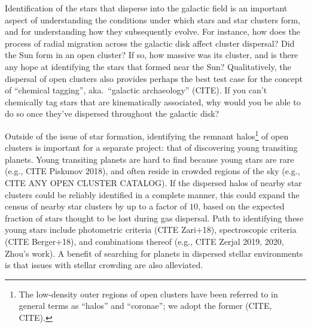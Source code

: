 \documentclass[12pt,twocolumn,tighten]{aastex63}
\begin{document}
Identification of the stars that disperse into the galactic field is an
important aspect of understanding the conditions under which stars and
star clusters form, and for understanding how they subsequently evolve.
For instance, how does the process of radial migration across the
galactic disk affect cluster dispersal?  Did the Sun form in an open
cluster? If so, how massive was its cluster, and is there any hope at
identifying the stars that formed near the Sun?  Qualitatively, the
dispersal of open clusters also provides perhaps the best test case for
the concept of ``chemical tagging'', aka.\ ``galactic archaeology''
(CITE).  If you can't chemically tag stars that are kinematically
associated, why would you be able to do so once they've dispersed
throughout the galactic disk?

Outside of the issue of star formation, identifying the remnant
halos\footnote{ The low-density outer regions of open clusters have
been referred to in general terms as ``halos'' and ``coronae''; we
adopt the former (CITE, CITE). } of open clusters is important for a
separate project: that of discovering young transiting planets.  Young
transiting planets are hard to find because young stars are rare
(e.g., CITE Piskunov 2018), and often reside in crowded regions of the
sky (e.g., CITE ANY OPEN CLUSTER CATALOG).  If the dispersed halos of
nearby star clusters could be reliably identified in a complete
manner, this could expand the census of nearby star clusters by up to
a factor of $10$, based on the expected fraction of stars thought to
be lost during gas dispersal.  Path to identifying these young stars
include photometric criteria (CITE Zari+18), spectroscopic criteria
(CITE Berger+18), and combinations thereof (e.g., CITE Zerjal 2019,
2020, Zhou's work).  A benefit of searching for planets in
dispersed stellar environments is that issues with stellar crowding
are also alleviated.
\end{document}
